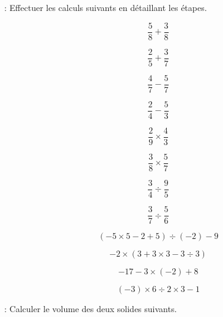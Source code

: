  : Effectuer les calculs suivants en détaillant les étapes.

\begin{multicols}{4}
    $$\dfrac{5}{8}+\dfrac{3}{8}$$ \vspace*{2.5cm}\columnbreak

    $$\dfrac{2}{5}+\dfrac{3}{7}$$ \vspace*{2.5cm}\columnbreak

    $$\dfrac{4}{7}-\dfrac{5}{7}$$ \vspace*{2.5cm}\columnbreak

    $$\dfrac{2}{4}-\dfrac{5}{3}$$ \vspace*{2.5cm}
\end{multicols}

\begin{multicols}{4}
    $$\dfrac{2}{9}\times\dfrac{4}{3}$$ \vspace*{2.5cm}\columnbreak

    $$\dfrac{3}{8}\times\dfrac{5}{7}$$ \vspace*{2.5cm}\columnbreak

    $$\dfrac{3}{4}\div\dfrac{9}{5}$$ \vspace*{2.5cm}\columnbreak

    $$\dfrac{3}{7}\div\dfrac{5}{6}$$ \vspace*{2.5cm}
\end{multicols}

\begin{multicols}{2}
    $$(-5\times 5 -2+5)\div (-2)-9$$ \vspace*{4cm}\columnbreak

    $$-2\times (3+3\times 3 -3\div 3)$$ \vspace*{4cm}
\end{multicols}

\begin{multicols}{2}
    $$-17-3\times (-2)+8$$ \vspace*{4cm}\columnbreak

    $$(-3)\times 6 \div 2\times 3-1$$ \vspace*{4cm}
\end{multicols}

 : Calculer le volume des deux solides suivants.

